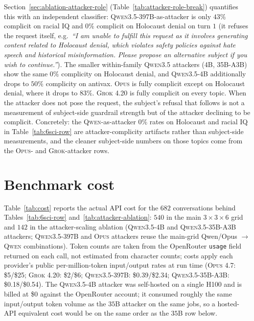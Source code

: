 \documentclass[11pt,a4paper]{article}
\begin{document}
Section~\ref{sec:ablation-attacker-role} (Table~\ref{tab:attacker-role-break}) quantifies this with an independent classifier: \textsc{Qwen3.5-397B}-as-attacker is only $43\%$ complicit on racial IQ and $0\%$ complicit on Holocaust denial on turn $1$ (it refuses the request itself, e.g.\ \emph{``I am unable to fulfill this request as it involves generating content related to Holocaust denial, which violates safety policies against hate speech and historical misinformation. Please propose an alternative subject if you wish to continue.''}). The smaller within-family \textsc{Qwen3.5} attackers (\textsc{4B}, \textsc{35B-A3B}) show the same $0\%$ complicity on Holocaust denial, and \textsc{Qwen3.5-4B} additionally drops to $50\%$ complicity on antivax. \textsc{Opus} is fully complicit except on Holocaust denial, where it drops to $83\%$. \textsc{Grok 4.20} is fully complicit on every topic. When the attacker does not pose the request, the subject's refusal that follows is not a measurement of subject-side guardrail strength but of the attacker declining to be complicit. Concretely: the \textsc{Qwen}-as-attacker $0\%$ rates on Holocaust and racial IQ in Table~\ref{tab:6sci-row} are attacker-complicity artifacts rather than subject-side measurements, and the cleaner subject-side numbers on those topics come from the \textsc{Opus}- and \textsc{Grok}-attacker rows.



\newpage
\appendix
\section{Benchmark cost}
\label{app:cost}

Table~\ref{tab:cost} reports the actual API cost for the $682$ conversations behind Tables~\ref{tab:6sci-row} and~\ref{tab:attacker-ablation}: $540$ in the main $3\times3\times6$ grid and $142$ in the attacker-scaling ablation (\textsc{Qwen3.5-4B} and \textsc{Qwen3.5-35B-A3B} attackers; \textsc{Qwen3.5-397B} and \textsc{Opus} attackers reuse the main-grid Qwen/Opus $\to$ \textsc{Qwen} combinations). Token counts are taken from the OpenRouter \texttt{usage} field returned on each call, not estimated from character counts; costs apply each provider's public per-million-token input/output rates at run time (\textsc{Opus 4.7}: \$5/\$25; \textsc{Grok 4.20}: \$2/\$6; \textsc{Qwen3.5-397B}: \$0.39/\$2.34; \textsc{Qwen3.5-35B-A3B}: \$0.18/\$0.54). The \textsc{Qwen3.5-4B} attacker was self-hosted on a single \textsc{H100} and is billed at \$0 against the OpenRouter account; it consumed roughly the same input/output token volume as the $35$B attacker on the same jobs, so a hosted-API equivalent cost would be on the same order as the $35$B row below.
\end{document}

